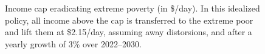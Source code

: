 \begin{figure}[h]
\caption{Income cap eradicating extreme poverty (in \$/day). In this idealized policy, all income above the cap is transferred to the extreme poor and lift them at \$2.15/day, assuming away distorsions, and after a yearly growth of 3\% over 2022--2030. %
}\label{fig:antipoverty_cap}
\end{figure} %

